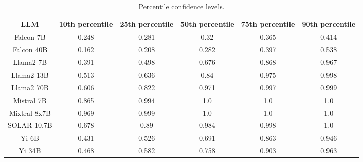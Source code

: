 \begin{table*}
\centering
\begin{tabular}{c|c|c|c|c|c}
LLM & 10th percentile & 25th percentile & 50th percentile & 75th percentile & 90th percentile\\ \hline
Falcon 7B & 0.248 & 0.281 & 0.32 & 0.365 & 0.414\\
Falcon 40B & 0.162 & 0.208 & 0.282 & 0.397 & 0.538\\
Llama2 7B & 0.391 & 0.498 & 0.676 & 0.868 & 0.967\\
Llama2 13B & 0.513 & 0.636 & 0.84 & 0.975 & 0.998\\
Llama2 70B & 0.606 & 0.822 & 0.971 & 0.997 & 0.999\\
Mistral 7B & 0.865 & 0.994 & 1.0 & 1.0 & 1.0\\
Mixtral 8x7B & 0.969 & 0.999 & 1.0 & 1.0 & 1.0\\
SOLAR 10.7B & 0.678 & 0.89 & 0.984 & 0.998 & 1.0\\
Yi 6B & 0.431 & 0.526 & 0.691 & 0.863 & 0.946\\
Yi 34B & 0.468 & 0.582 & 0.758 & 0.903 & 0.963\\
\hline
\end{tabular}
\caption{Percentile confidence levels.}
\label{tab:percentile_conf}
\end{table*}
